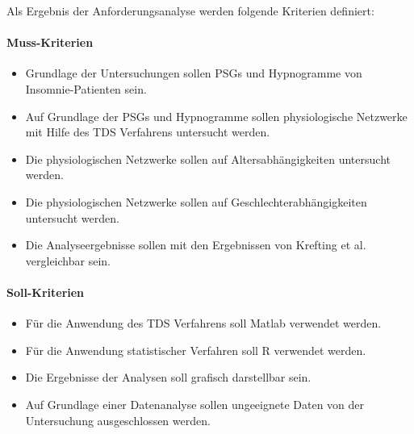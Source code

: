 Als Ergebnis der Anforderungsanalyse werden folgende Kriterien definiert:\\


\paragraph{Muss-Kriterien}
\begin{itemize} 
\item Grundlage der Untersuchungen sollen \acs{PSG}s und Hypnogramme von Insomnie-Patienten sein.
\item Auf Grundlage der \acs{PSG}s und Hypnogramme sollen physiologische Netzwerke mit Hilfe des \acs{TDS} Verfahrens untersucht werden. 
\item Die physiologischen Netzwerke sollen auf Altersabhängigkeiten untersucht werden. 
\item Die physiologischen Netzwerke sollen auf Geschlechterabhängigkeiten untersucht werden.
\item Die Analyseergebnisse sollen mit den Ergebnissen von Krefting et al. \parencite{krefting_age_2017} vergleichbar sein. 
\end{itemize}

\paragraph{Soll-Kriterien}
\begin{itemize}
\item Für die Anwendung des \acs{TDS} Verfahrens soll Matlab verwendet werden.
\item Für die Anwendung statistischer Verfahren soll R verwendet werden. 
\item Die Ergebnisse der Analysen soll grafisch darstellbar sein.
\item Auf Grundlage einer Datenanalyse sollen ungeeignete Daten von der Untersuchung ausgeschlossen werden.
\end{itemize}

